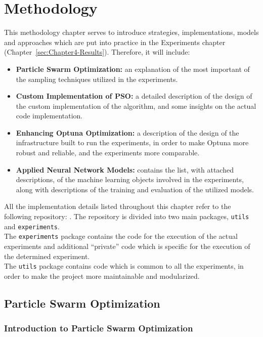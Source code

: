 \chapter{Methodology}\label{sec:Chapter3-Methodology}

This methodology chapter serves to introduce strategies, implementations, models and approaches which are put into practice in the Experiments chapter (Chapter~\ref{sec:Chapter4-Results}). Therefore, it will include:
\begin{itemize}[itemsep=0.1cm]
    \item \textbf{Particle Swarm Optimization:} an explanation of the most important of the sampling techniques utilized in the experiments.
    \item \textbf{Custom Implementation of PSO:} a detailed description of the design of the custom implementation of the algorithm, and some insights on the actual code implementation.
    \item \textbf{Enhancing Optuna Optimization:} a description of the design of the infrastructure built to run the experiments, in order to make Optuna more robust and reliable, and the experiments more comparable.
    \item \textbf{Applied Neural Network Models:} contains the list, with attached descriptions, of the machine learning objects involved in the experiments, along with descriptions of the training and evaluation of the utilized models.
\end{itemize}

All the implementation details listed throughout this chapter refer to the following repository: \cite{Repository-THESIS}.
The repository is divided into two main packages, \texttt{utils} and \texttt{experiments}.
\\[0.3cm]The \texttt{experiments} package contains the code for the execution of the actual experiments and additional “private” code which is specific for the execution of the determined experiment.
\\[0.3cm]The \texttt{utils} package contains code which is common to all the experiments, in order to make the project more maintainable and modularized.

\section{Particle Swarm Optimization}

\subsection{Introduction to Particle Swarm Optimization}

